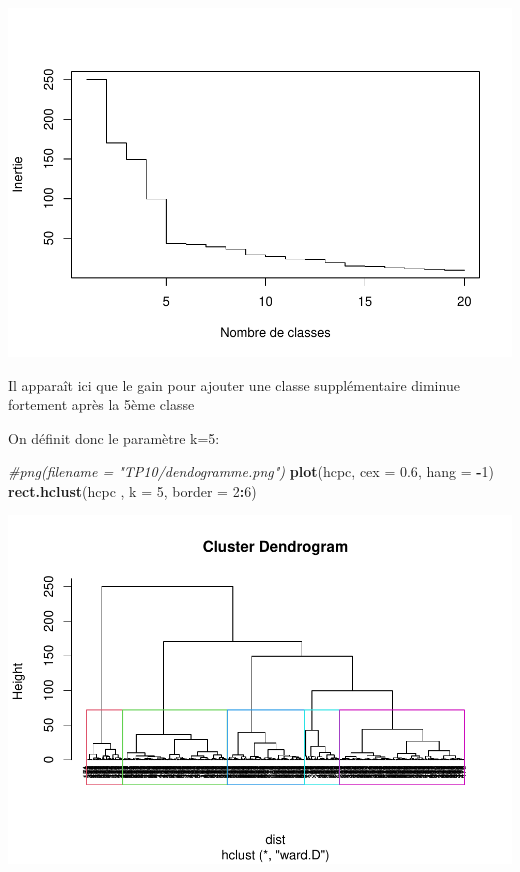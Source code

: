 \documentclass[
]{book}
\newenvironment{Shaded}{\begin{snugshade}}{\end{snugshade}}
\newcommand{\AttributeTok}[1]{\textcolor[rgb]{0.13,0.29,0.53}{#1}}
\newcommand{\CommentTok}[1]{\textcolor[rgb]{0.56,0.35,0.01}{\textit{#1}}}
\newcommand{\DecValTok}[1]{\textcolor[rgb]{0.00,0.00,0.81}{#1}}
\newcommand{\FloatTok}[1]{\textcolor[rgb]{0.00,0.00,0.81}{#1}}
\newcommand{\FunctionTok}[1]{\textcolor[rgb]{0.13,0.29,0.53}{\textbf{#1}}}
\newcommand{\NormalTok}[1]{#1}
\newcommand{\SpecialCharTok}[1]{\textcolor[rgb]{0.81,0.36,0.00}{\textbf{#1}}}
\begin{document}
\includegraphics{manuel_geo_quanti_files/figure-latex/unnamed-chunk-96-1.pdf}

Il apparaît ici que le gain pour ajouter une classe supplémentaire diminue fortement après la 5ème classe

On définit donc le paramètre k=5:

\begin{Shaded}
\begin{Highlighting}[]
\CommentTok{\#png(filename = "TP10/dendogramme.png")}
\FunctionTok{plot}\NormalTok{(hcpc, }\AttributeTok{cex =} \FloatTok{0.6}\NormalTok{, }\AttributeTok{hang =} \SpecialCharTok{{-}}\DecValTok{1}\NormalTok{)}
\FunctionTok{rect.hclust}\NormalTok{(hcpc , }\AttributeTok{k =} \DecValTok{5}\NormalTok{, }\AttributeTok{border =} \DecValTok{2}\SpecialCharTok{:}\DecValTok{6}\NormalTok{)}
\end{Highlighting}
\end{Shaded}

\includegraphics{manuel_geo_quanti_files/figure-latex/unnamed-chunk-97-1.pdf}
\end{document}
